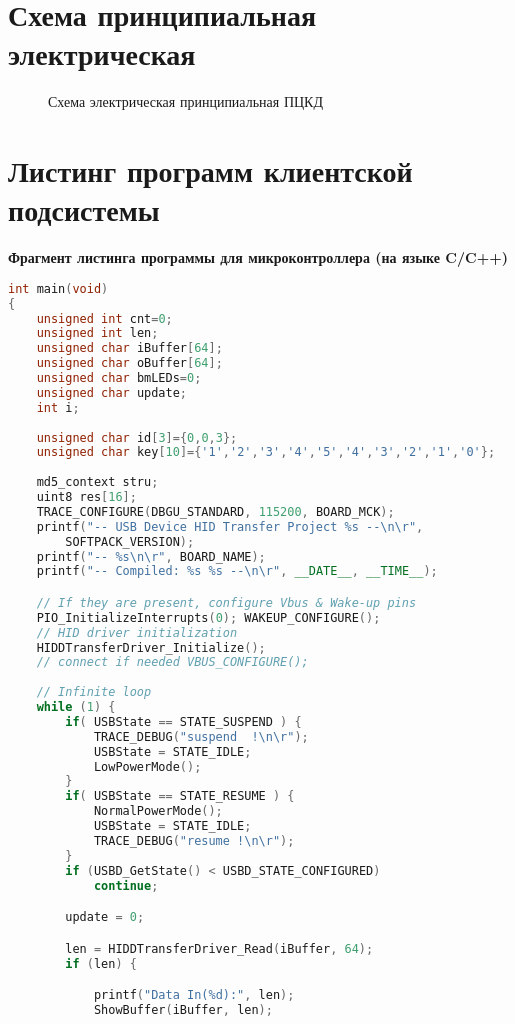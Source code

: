 \chapter{Схема принципиальная электрическая}
\label{pril:A}
\begin{figure}[h!]
\caption{Схема электрическая принципиальная ПЦКД}
\label{ris:cxeme}
\end{figure}


\chapter{Листинг программ клиентской подсистемы}
\label{pril:B}
\textbf{Фрагмент листинга программы для микроконтроллера (на языке C/C++)}
{\small
\begin{lstlisting}[language=C++]
int main(void)
{
    unsigned int cnt=0;
    unsigned int len;
    unsigned char iBuffer[64];
    unsigned char oBuffer[64];
    unsigned char bmLEDs=0;
    unsigned char update;
    int i;   
    
    unsigned char id[3]={0,0,3};
    unsigned char key[10]={'1','2','3','4','5','4','3','2','1','0'};
        
    md5_context stru;
    uint8 res[16];
    TRACE_CONFIGURE(DBGU_STANDARD, 115200, BOARD_MCK);
    printf("-- USB Device HID Transfer Project %s --\n\r", 
    	SOFTPACK_VERSION);
    printf("-- %s\n\r", BOARD_NAME);
    printf("-- Compiled: %s %s --\n\r", __DATE__, __TIME__);

    // If they are present, configure Vbus & Wake-up pins
    PIO_InitializeInterrupts(0); WAKEUP_CONFIGURE();
    // HID driver initialization
    HIDDTransferDriver_Initialize(); 
    // connect if needed VBUS_CONFIGURE();
       
    // Infinite loop
    while (1) {
        if( USBState == STATE_SUSPEND ) {
            TRACE_DEBUG("suspend  !\n\r");
            USBState = STATE_IDLE;
            LowPowerMode();
        }
        if( USBState == STATE_RESUME ) {
            NormalPowerMode();
            USBState = STATE_IDLE;
            TRACE_DEBUG("resume !\n\r");
        }
        if (USBD_GetState() < USBD_STATE_CONFIGURED)
            continue;

        update = 0;

        len = HIDDTransferDriver_Read(iBuffer, 64);
        if (len) {

            printf("Data In(%d):", len);
            ShowBuffer(iBuffer, len);


\end{lstlisting}}
